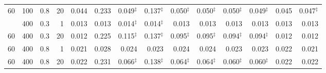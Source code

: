 \begin{tabular}{@{}rrrrrrrrrrrrrr@{}}
60 & 100 & 0.8 & 20 & 0.044 & 0.233 & 0.049$^{\ddagger}$ & 0.137$^{\ddagger}$ & 0.050$^{\ddagger}$ & 0.050$^{\ddagger}$ & 0.050$^{\ddagger}$ & 0.049$^{\ddagger}$ & 0.045 & 0.047$^{\ddagger}$ \\
\addlinespace[1pt]
60 & 400 & 0.3 & 1 & 0.013 & 0.013 & 0.014$^{\ddagger}$ & 0.014$^{\ddagger}$ & 0.013 & 0.013 & 0.013 & 0.013 & 0.013 & 0.013 \\
60 & 400 & 0.3 & 20 & 0.012 & 0.225 & 0.115$^{\ddagger}$ & 0.137$^{\ddagger}$ & 0.095$^{\ddagger}$ & 0.095$^{\ddagger}$ & 0.094$^{\ddagger}$ & 0.094$^{\ddagger}$ & 0.012 & 0.012 \\
60 & 400 & 0.8 & 1 & 0.021 & 0.028 & 0.024 & 0.023 & 0.024 & 0.024 & 0.023 & 0.023 & 0.022 & 0.021 \\
60 & 400 & 0.8 & 20 & 0.022 & 0.231 & 0.066$^{\ddagger}$ & 0.138$^{\ddagger}$ & 0.064$^{\ddagger}$ & 0.064$^{\ddagger}$ & 0.060$^{\ddagger}$ & 0.060$^{\ddagger}$ & 0.022 & 0.022 \\
\bottomrule
\end{tabular}